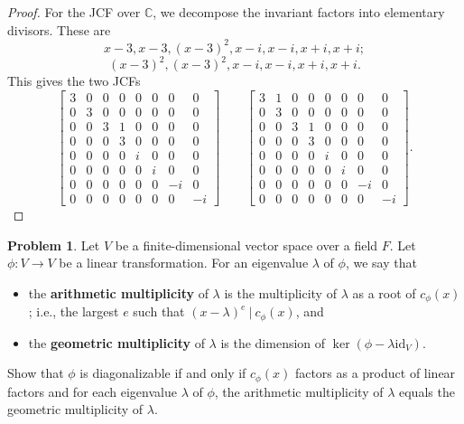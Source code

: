 \documentclass[11pt]{article}
\newcommand{\C}{\mathbb{C}}
\theoremstyle{definition}
\newtheorem{problem}{Problem}
\begin{document}
\begin{proof}
       For the JCF over $\C$, we decompose the invariant factors into elementary divisors. These are
       \[ x-3 , x-3, (x-3)^2, x-i, x-i, x+i, x+i ; \]
\[(x-3)^2,(x-3)^2, x-i, x-i, x+i, x+i.\]
This gives the two JCFs
\[ \begin{bmatrix} 
3 & 0 & 0 & 0 & 0 & 0 & 0 & 0  \\
 0 & 3 & 0 & 0 & 0 & 0 & 0 & 0  \\ 
  0 & 0 & 3 & 1 & 0 & 0 & 0 & 0  \\ 
   0 & 0 & 0 & 3 & 0 & 0 & 0 & 0  \\ 
    0 & 0 & 0 & 0 & i & 0 & 0 & 0  \\ 
     0 & 0 & 0 & 0 & 0 & i & 0 & 0  \\ 
      0 & 0 & 0 & 0 & 0 & 0 & -i & 0  \\ 
       0 & 0 & 0 & 0 & 0 & 0 & 0 & -i  
       \end{bmatrix} \qquad 
  \begin{bmatrix} 
3 & 1 & 0 & 0 & 0 & 0 & 0 & 0  \\
 0 & 3 & 0 & 0 & 0 & 0 & 0 & 0  \\ 
  0 & 0 & 3 & 1 & 0 & 0 & 0 & 0  \\ 
   0 & 0 & 0 & 3 & 0 & 0 & 0 & 0  \\ 
    0 & 0 & 0 & 0 & i & 0 & 0 & 0  \\ 
     0 & 0 & 0 & 0 & 0 & i & 0 & 0  \\ 
      0 & 0 & 0 & 0 & 0 & 0 & -i & 0  \\ 
       0 & 0 & 0 & 0 & 0 & 0 & 0 & -i  
             \end{bmatrix}.\]

\end{proof}

\begin{problem} Let $V$ be a finite-dimensional vector space over a field $F$. Let $\phi:V\to V$ be a linear transformation. For an eigenvalue $\lambda$ of $\phi$, we say that
\begin{itemize}
\item the \textbf{arithmetic multiplicity} of $\lambda$ is the multiplicity of $\lambda$ as a root of $c_\phi(x)$; i.e., the largest $e$ such that $(x-\lambda)^e \ | \ c_\phi(x)$, and
\item the \textbf{geometric multiplicity} of $\lambda$ is the dimension of $\ker(\phi-\lambda \mathrm{id}_V)$.
\end{itemize}
Show that $\phi$ is diagonalizable if and only if $c_\phi(x)$ factors as a product of linear factors and for each eigenvalue $\lambda$ of $\phi$, the arithmetic multiplicity of $\lambda$ equals the geometric multiplicity of $\lambda$.
\end{problem}
\end{document}
